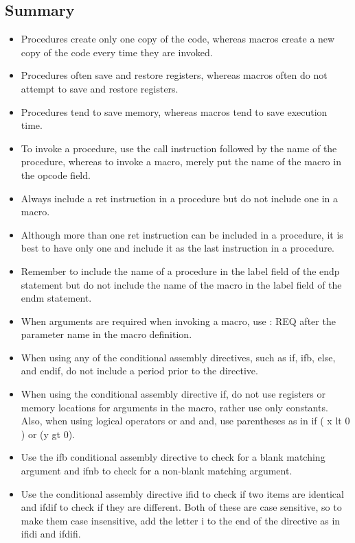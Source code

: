 \documentclass[10pt]{article}
\begin{document}
\subsection*{Summary}
\begin{itemize}
  \item Procedures create only one copy of the code, whereas macros create a new copy of the code every time they are invoked.
  \item Procedures often save and restore registers, whereas macros often do not attempt to save and restore registers.
  \item Procedures tend to save memory, whereas macros tend to save execution time.
  \item To invoke a procedure, use the call instruction followed by the name of the procedure, whereas to invoke a macro, merely put the name of the macro in the opcode field.
  \item Always include a ret instruction in a procedure but do not include one in a macro.
  \item Although more than one ret instruction can be included in a procedure, it is best to have only one and include it as the last instruction in a procedure.
  \item Remember to include the name of a procedure in the label field of the endp statement but do not include the name of the macro in the label field of the endm statement.
  \item When arguments are required when invoking a macro, use : REQ after the parameter name in the macro definition.
  \item When using any of the conditional assembly directives, such as if, ifb, else, and endif, do not include a period prior to the directive.
  \item When using the conditional assembly directive if, do not use registers or memory locations for arguments in the macro, rather use only constants. Also, when using logical operators or and and, use parentheses as in if ( x lt 0 ) or (y gt 0).
  \item Use the ifb conditional assembly directive to check for a blank matching argument and ifnb to check for a non-blank matching argument.
  \item Use the conditional assembly directive ifid to check if two items are identical and ifdif to check if they are different. Both of these are case sensitive, so to make them case insensitive, add the letter i to the end of the directive as in ifidi and ifdifi.
\end{itemize}
\end{document}

